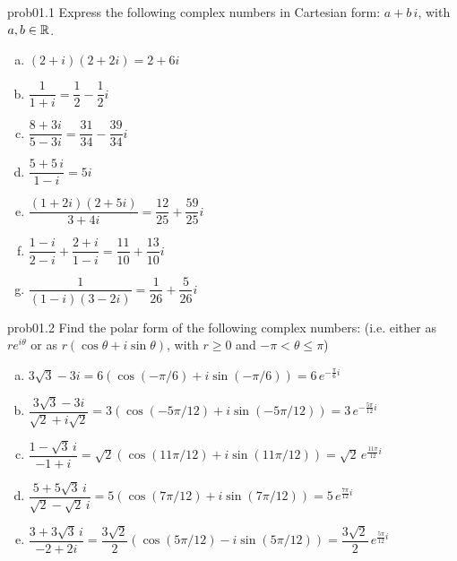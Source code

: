 
\begin{sol}{prob01.1} Express the following complex numbers in  Cartesian form: $a + b \,i$, with $a, b \in \mathbb{R}$.
\medskip
\begin{enumerate}[a)]
\item    $(2+i)(2+2 i)=2+6i$ \medskip  
\item $ \dfrac 1{1+i}=\dfrac{1}{2}- \dfrac{1}{2} i$\medskip 
\item $  \dfrac{8+3i}{5-3i}=\dfrac{31}{34}-\dfrac{39}{34}i$\medskip 
\item $\dfrac{5+5 \,i}{1-i}= 5 i$\medskip
% 
\item $\dfrac{(1+2i)(2+5i)}{3+4i}=\dfrac{ 12}{25} +\dfrac{59}{25}i  $

\item $\dfrac{1-i}{2-i}+\dfrac{2+i}{1-i}= \dfrac{11}{10}+\dfrac{13 }{10}i$\smallskip
% 
\item $\dfrac 1{(1-i)(3-2i)}=\dfrac{1}{26}+\dfrac{5 }{26}i$
%
\end{enumerate}

\end{sol} 

\begin{sol}{prob01.2} Find the polar form of the following complex numbers: (i.e. either  as $r e^{i\theta}$ or as $r(\cos \theta + i \sin \theta)$, with $r\geq 0$ and $-\pi <\theta \leq \pi$)\medskip
\begin{enumerate}[a)]

\item ${3\sqrt{3}-3i}=6(\cos (-\pi /6)+i \sin (-\pi /6))=6\, e^{-\frac{\pi}{6}i} $
\item $\dfrac{3\sqrt{3}-3i} {\sqrt{2}+i\sqrt{2}}=3(\cos (-5\pi /12)+i \sin (-5\pi /12)) =3\, e^{-\frac{5\pi}{12}i} $

\item $\dfrac{1-\sqrt{3}\,i}{-1+i}=\sqrt{2}(\cos (11\pi/12)+i\sin (11\pi /12))=\sqrt{2}\, e^{\frac{11\pi}{12}i} $
\item $\dfrac{5+5\sqrt{3}\,i}{\sqrt{2}-\sqrt{2}\,i}=5(\cos (7\pi /12)+i\sin (7\pi/12))= 5\,e^{\frac{7\pi}{12}i}$
\item $\dfrac{3+3\sqrt{3}\,i} {-2+2i}=\dfrac{3\sqrt{2}}{2}(\cos (5\pi /12)-i\sin (5\pi/12))=\dfrac{3\sqrt{2}}{2}\,e^{\frac{5\pi}{12}i}$
\end{enumerate}

\end{sol} 


 

